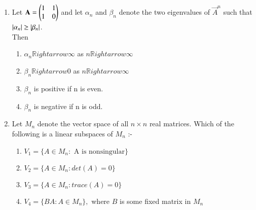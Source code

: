 \begin{enumerate}[label=\thesection.\arabic*.,ref=\thesection.\theenumi]
\item %
Let $\mathbf{A}=\begin{pmatrix}1 & 1\\1 & 0\end{pmatrix}$ and let $\alpha_n$ and $\beta_n$ denote the two eigenvalues of $\vec{A}^n$ such that $\left\vert\alpha_n\right\vert\geq\left\vert\beta_n\right\vert$.\\
Then
\begin{enumerate}
    \item $\alpha_n\mathbb{R}ightarrow \infty$ as $n\mathbb{R}ightarrow \infty$
    \item $\beta_n\mathbb{R}ightarrow 0$ as $n\mathbb{R}ightarrow \infty$
    \item $\beta_n$ is positive if n is even.
    \item $\beta_n$ is negative if n is odd.
\end{enumerate}
%
\solution

\item Let $M_n$ denote the vector space of all $n\times n$ real matrices. Which of the following is a linear subspaces of $M_n$ :-
\begin{enumerate}
\item $ V_1 = \{  A \in M_n : \text{ A is nonsingular} \}$
\item $ V_2 = \{  A \in M_n : det(A) = 0 \}$
\item $ V_3 = \{  A \in M_n : trace(A) = 0 \}$
\item $ V_4 = \{  BA : A \in M_n\},$ where $ B$ is some fixed matrix in $ M_n$
\end{enumerate}
%
\solution



\end{enumerate}
